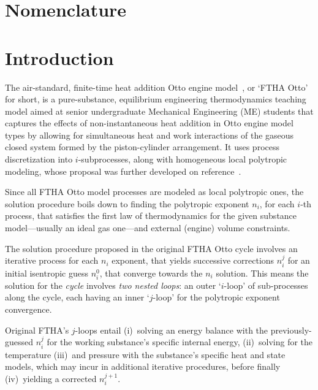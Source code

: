 \section*{Nomenclature}



\section{Introduction}

    The air-standard, finite-time heat addition Otto engine model~\cite{2017-NaaktgeborenC-IntJMechEngEduc}, or `FTHA Otto'  for
    short, is a pure-substance, equilibrium engineering thermodynamics teaching model aimed at senior  undergraduate  Mechanical
    Engineering (ME) students that captures the effects of non-instantaneous  heat  addition  in  Otto  engine  model  types  by
    allowing for simultaneous heat and work interactions of the gaseous closed system formed by the piston-cylinder arrangement.
    It uses process discretization into $i$-subprocesses, along with homogeneous local polytropic modeling, whose  proposal  was
    further developed on reference~\cite{2020-NaaktgeborenC-Polytropic-engrXiv-rev02}.

    Since all FTHA Otto model processes are modeled as local polytropic ones, the solution procedure boils down to  finding  the
    polytropic exponent $n_i$, for each $i$-th process, that satisfies the first law of thermodynamics for the  given  substance
    model---usually an ideal gas one---and external (engine) volume constraints.

    The solution procedure proposed in the original FTHA Otto cycle involves an iterative process for each $n_i$ exponent,  that
    yields successive corrections $n_i^j$ for an initial isentropic guess $n_i^0$, that converge  towards  the  $n_i$  solution.
    This means the solution for the \emph{cycle} involves \emph{two nested loops}: an outer `$i$-loop'  of  sub-processes  along
    the cycle, each having an inner `$j$-loop' for the polytropic exponent convergence.

    Original FTHA's $j$-loops entail (i)~solving  an  energy  balance  with  the  previously-guessed  $n_i^j$  for  the  working
    substance's specific internal energy, (ii)~solving for the temperature (iii)~and pressure with the substance's specific heat
    and state models, which may incur in additional iterative procedures, before finally (iv)~yielding a corrected $n_i^{j+1}$.

